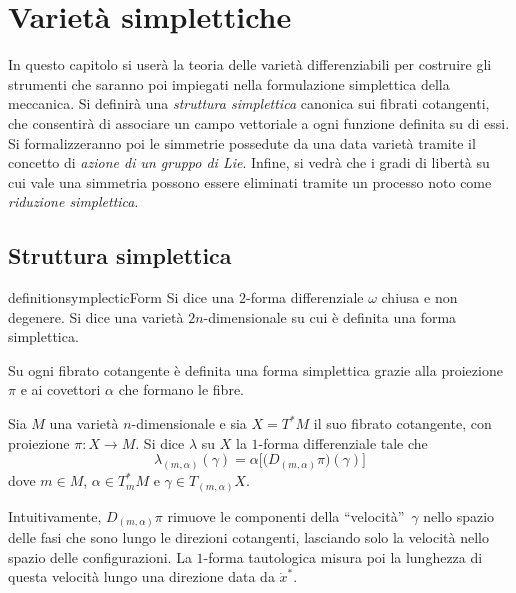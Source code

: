 \chapter{Varietà simplettiche}
In questo capitolo si userà la teoria delle varietà differenziabili per costruire gli strumenti che saranno poi impiegati nella formulazione simplettica della meccanica. Si definirà una \emph{struttura simplettica} canonica sui fibrati cotangenti, che consentirà di associare un campo vettoriale a ogni funzione definita su di essi. Si formalizzeranno poi le simmetrie possedute da una data varietà tramite il concetto di \emph{azione di un gruppo di Lie}. Infine, si vedrà che i gradi di libertà su cui vale una simmetria possono essere eliminati tramite un processo noto come \emph{riduzione simplettica}.

\section{Struttura simplettica}

\begin{restatable}{definition}{symplecticForm}
  Si dice  una $2$-forma differenziale $\omega$ chiusa e non degenere. Si dice  una varietà $2n$-dimensionale su cui è definita una forma simplettica.
\end{restatable}
Su ogni fibrato cotangente è definita una forma simplettica grazie alla proiezione $\pi$ e ai covettori $\alpha$ che formano le fibre.
\begin{definition}
  Sia $M$ una varietà $n$-dimensionale e sia $X = T^*M$ il suo fibrato cotangente, con proiezione $\pi:X\to M$. Si dice  $\lambda$ su $X$ la $1$-forma differenziale tale che \begin{equation*}
  \lambda_{(m, \alpha)}(\gamma) = \alpha \bigg[\big(D_{(m, \alpha)} \pi\big)(\gamma)\bigg]
  \end{equation*} 
  dove $m \in M$, $\alpha \in T_m^* M$ e $\gamma \in T_{(m,\alpha)}X$.
\end{definition}
\begin{remark}
  Intuitivamente, $D_{(m,\alpha)} \pi$ rimuove le componenti della \textquotedblleft velocità\textquotedblright\ $\gamma$ nello spazio delle fasi che sono lungo le direzioni cotangenti, lasciando solo la velocità nello spazio delle configurazioni. La $1$-forma tautologica misura poi la lunghezza di questa velocità lungo una direzione data da $\dot{x}^*$. 
\end{remark}

